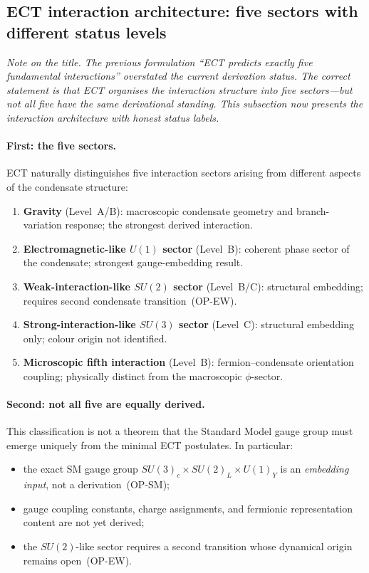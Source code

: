 \documentclass[11pt,a4paper]{article}
\numberwithin{equation}{section}
\begin{document}
\subsection{ECT interaction architecture: five sectors with different status levels}
\label{sec:five_interactions}

\textit{Note on the title.
The previous formulation ``ECT predicts exactly five fundamental interactions''
overstated the current derivation status.
The correct statement is that ECT organises the interaction structure
into five sectors---but not all five have the same derivational standing.
This subsection now presents the interaction architecture with honest status labels.}

\paragraph{First: the five sectors.}
ECT naturally distinguishes five interaction sectors arising from
different aspects of the condensate structure:
\begin{enumerate}
  \item \textbf{Gravity} (Level~A/B): macroscopic condensate geometry and
    branch-variation response; the strongest derived interaction.
  \item \textbf{Electromagnetic-like $U(1)$ sector} (Level~B): coherent
    phase sector of the condensate; strongest gauge-embedding result.
  \item \textbf{Weak-interaction-like $SU(2)$ sector} (Level~B/C):
    structural embedding; requires second condensate transition~(OP-EW).
  \item \textbf{Strong-interaction-like $SU(3)$ sector} (Level~C):
    structural embedding only; colour origin not identified.
  \item \textbf{Microscopic fifth interaction} (Level~B): fermion--condensate
    orientation coupling; physically distinct from the macroscopic
    $\phi$-sector.
\end{enumerate}

\paragraph{Second: not all five are equally derived.}
This classification is not a theorem that the Standard Model gauge
group must emerge uniquely from the minimal ECT postulates.
In particular:
\begin{itemize}
  \item the exact SM gauge group $SU(3)_c\times SU(2)_L\times U(1)_Y$
    is an \emph{embedding input}, not a derivation~(OP-SM);
  \item gauge coupling constants, charge assignments, and fermionic
    representation content are not yet derived;
  \item the $SU(2)$-like sector requires a second transition whose
    dynamical origin remains open~(OP-EW).
\end{itemize}
\end{document}
